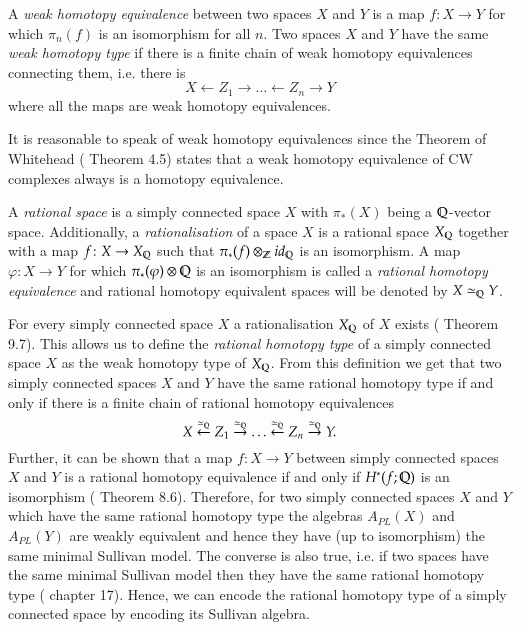 \begin{Definition}
 A \emph{weak homotopy equivalence} between two spaces $X$ and $Y$ is a map $f \colon X \to Y$ for which
 $\pi_n(f)$ is an isomorphism for all $n$. Two spaces $X$ and $Y$ have the same \emph{weak homotopy type}
 if there is a finite chain of weak homotopy equivalences connecting them, i.e. there is
 $$ X \leftarrow Z_1 \rightarrow \ldots \leftarrow Z_n \rightarrow Y $$
 where all the maps are weak homotopy equivalences.
\end{Definition}

\begin{Remark}
 It is reasonable to speak of weak homotopy equivalences since the Theorem of Whitehead (\cite{SWB-334616069} Theorem 4.5)
 states that a weak homotopy equivalence of CW complexes always is a homotopy equivalence.
\end{Remark}


\begin{Definition}
 A \emph{rational space} is a simply connected space $X$ with $\pi_*(X)$ being a $\mathbb{Q}$-vector space.
 Additionally, a  \emph{rationalisation} of a space $X$ is a rational space $X_{\mathbb{Q}}$ together with a map
 $f \colon X \to X_{\mathbb{Q}}$ such that $\pi_*(f) \otimes_{\mathbb{Z}} id_{\mathbb{Q}}$ is an isomorphism. 
 A map $\varphi \colon X \to Y$ for which $\pi_*(\varphi) \otimes \mathbb{Q}$ is an isomorphism is 
 called a \emph{rational homotopy equivalence} and rational homotopy equivalent spaces will be denoted by
 $X \simeq_{\mathbb{Q}} Y$.
\end{Definition}

\begin{Remark}
 For every simply connected space $X$ a rationalisation $X_{\mathbb{Q}}$ of $X$ exists (\cite{Felix2001} Theorem 9.7).
 This allows us to define the \emph{rational homotopy type} of a simply connected space $X$ as the weak homotopy type of $X_{\mathbb{Q}}$.
 From this definition we get that two simply connected
 spaces $X$ and $Y$ have the same rational homotopy type if and only if there is a finite chain
 of rational homotopy equivalences
 $$ X \overset{\simeq_{\mathbb{Q}}}{\leftarrow} Z_1 \overset{\simeq_{\mathbb{Q}}}{\rightarrow} \ldots \overset{\simeq_{\mathbb{Q}}}{\leftarrow}
 Z_n \overset{\simeq_{\mathbb{Q}}}{\rightarrow} Y.$$
 Further, it can be shown that a map $f \colon X \to Y$ between simply connected spaces $X$ and $Y$
 is a rational homotopy equivalence if and only if $H^*(f;\mathbb{Q})$ 
 is an isomorphism (\cite{Felix2001} Theorem 8.6). Therefore, for two simply connected
 spaces $X$ and $Y$ which have the 
 same rational homotopy type the algebras $A_{PL}(X)$ and $A_{PL}(Y)$ are weakly equivalent and hence they 
 have (up to isomorphism) the same minimal Sullivan model. The converse is also true, i.e. if two
 spaces have the same minimal Sullivan model then they have the same rational homotopy type (\cite{Felix2001} chapter 17).
 Hence, we can encode the rational homotopy type of a simply connected space by encoding its Sullivan algebra.
\end{Remark}


